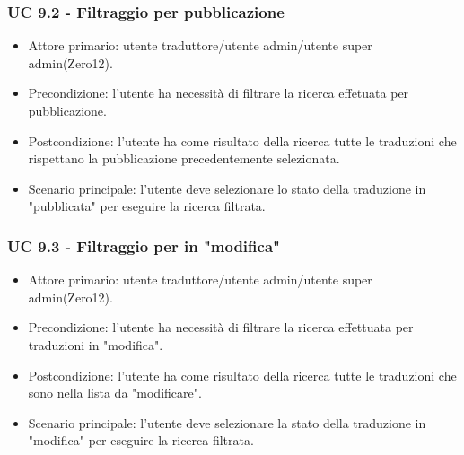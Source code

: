     \subsubsection{UC 9.2 - Filtraggio per pubblicazione}
        \begin{itemize}
            \item Attore primario: utente traduttore/utente admin/utente super admin(Zero12).
            \item Precondizione: l'utente ha necessità di filtrare la ricerca effetuata per pubblicazione.
            \item Postcondizione: l'utente ha come risultato della ricerca tutte le traduzioni che rispettano la pubblicazione precedentemente selezionata. 
            \item Scenario principale: l'utente deve selezionare lo stato della traduzione in "pubblicata" per eseguire la ricerca filtrata.
        \end{itemize}
    \subsubsection{UC 9.3 - Filtraggio per in "modifica"}
        \begin{itemize}
            \item Attore primario: utente traduttore/utente admin/utente super admin(Zero12).
            \item Precondizione: l'utente ha necessità di filtrare la ricerca effettuata per traduzioni in "modifica".
            \item Postcondizione: l'utente ha come risultato della ricerca tutte le traduzioni che sono nella lista da "modificare". 
            \item Scenario principale: l'utente deve selezionare la stato della traduzione in "modifica" per eseguire la ricerca filtrata.
        \end{itemize}
